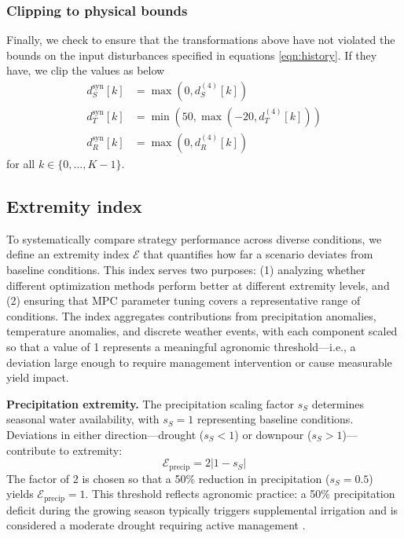 \documentclass[preprint,12pt]{elsarticle}
\begin{document}
\subsubsection{Clipping to physical bounds}\label{subsubsec:clipping}

Finally, we check to ensure that the transformations above have not violated the bounds on the input disturbances specified in equations \ref{eqn:history}. If they have, we clip the values as below
\begin{align}
d_{S}^{\text{syn}}[k] &= \max(0, d_{S}^{(4)}[k]) \\
d_{T}^{\text{syn}}[k] &= \min(50, \max(-20, d_{T}^{(4)}[k])) \\
d_{R}^{\text{syn}}[k] &= \max(0, d_{R}^{(4)}[k])
\label{eqn:PTR-syn}
\end{align}
for all $k\in\{ 0,...,K-1 \}$.

\subsection{Extremity index}\label{subsec:extremity}

To systematically compare strategy performance across diverse conditions, we define an extremity index $\mathcal{E}$ that quantifies how far a scenario deviates from baseline conditions. This index serves two purposes: (1) analyzing whether different optimization methods perform better at different extremity levels, and (2) ensuring that MPC parameter tuning covers a representative range of conditions. The index aggregates contributions from precipitation anomalies, temperature anomalies, and discrete weather events, with each component scaled so that a value of 1 represents a meaningful agronomic threshold---i.e., a deviation large enough to require management intervention or cause measurable yield impact.

\textbf{Precipitation extremity.} The precipitation scaling factor $s_S$ determines seasonal water availability, with $s_S = 1$ representing baseline conditions. Deviations in either direction---drought ($s_S < 1$) or downpour ($s_S > 1$)---contribute to extremity:
\begin{equation}
\mathcal{E}_{\text{precip}} = 2|1 - s_{S}|
\label{eqn:extreme-precip}
\end{equation}
The factor of 2 is chosen so that a 50\% reduction in precipitation ($s_S = 0.5$) yields $\mathcal{E}_{\text{precip}} = 1$. This threshold reflects agronomic practice: a 50\% precipitation deficit during the growing season typically triggers supplemental irrigation and is considered a moderate drought requiring active management \cite{kranz2008irrigation}.
\end{document}
